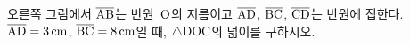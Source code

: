 \noindent\begin{minipage}[t]{0.58\linewidth}\vspace{0pt}\raggedright 오른쪽 그림에서 $\overline{\mathrm{AB}}$는 반원~$\mathrm{O}$의 지름이고 $\overline{\mathrm{AD}}$, $\overline{\mathrm{BC}}$, $\overline{\mathrm{CD}}$는 반원에 접한다. $\overline{\mathrm{AD}}=3\,\mathrm{cm}$, $\overline{\mathrm{BC}}=8\,\mathrm{cm}$일 때, $\triangle\mathrm{DOC}$의 넓이를 구하시오.\end{minipage}\hfill\begin{minipage}[t]{0.4\linewidth}\vspace{0pt}\centering \resizebox{\ifdim\width>\linewidth\linewidth\else\width\fi}{!}{}\end{minipage}\par
